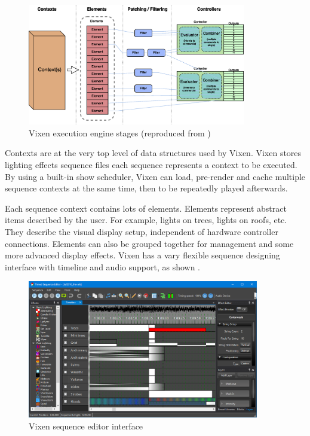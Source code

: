 \begin{figure}[!t]
  \centering
  \includegraphics[width=0.85\textwidth]{Figs//V3-Engine-1.eps}
  \caption{\footnotesize Vixen execution engine stages (reproduced from \cite{vixen})}
  \label{fig:stages}
\end{figure}

Contexts are at the very top level of data structures used by Vixen. Vixen stores lighting effects  sequence files\ca{;} each sequence represents a context to be executed. By using a built-in show scheduler, Vixen can load, pre-render and cache multiple sequence contexts at the same time, then  to be repeatedly played afterwards.

Each sequence context contains lots of elements. Elements represent abstract items described by the user. For example, lights on trees, lights on roofs, etc. They describe the visual display setup, independent of hardware controller connections. Elements can also be grouped together for management and some more advanced display effects. Vixen has a vary flexible sequence designing interface with timeline and audio support, as shown  .

\begin{figure}[!t]
  \centering
  \includegraphics[width=0.9\textwidth]{Figs//vixen_editor.png}
  \caption{\footnotesize Vixen sequence editor interface}
  \label{fig:vixen-editor}
\end{figure}

